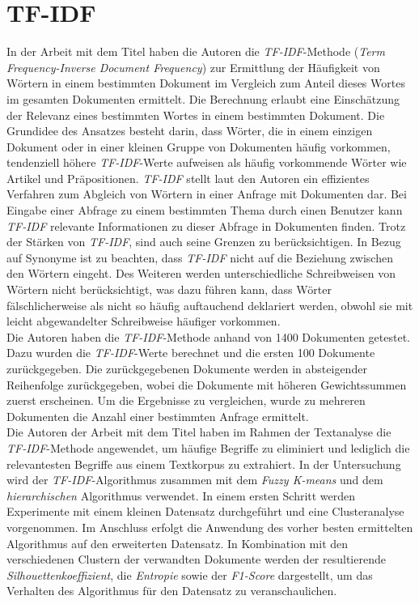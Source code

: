 \section{TF-IDF}
In der Arbeit mit dem Titel \cite{ramos2003using} haben die Autoren \citeauthor{ramos2003using} die \emph{TF-IDF}-Methode (\emph{Term Frequency-Inverse Document Frequency}) zur Ermittlung der Häufigkeit von Wörtern in einem bestimmten Dokument im Vergleich zum Anteil dieses Wortes im gesamten Dokumenten ermittelt. Die Berechnung erlaubt eine Einschätzung der Relevanz eines bestimmten Wortes in einem bestimmten Dokument. Die Grundidee des Ansatzes besteht darin, dass Wörter, die in einem einzigen Dokument oder in einer kleinen Gruppe von Dokumenten häufig vorkommen, tendenziell höhere \emph{TF-IDF}-Werte aufweisen als häufig vorkommende Wörter wie Artikel und Präpositionen. \emph{TF-IDF} stellt laut den Autoren ein effizientes Verfahren zum Abgleich von Wörtern in einer Anfrage mit Dokumenten dar. Bei Eingabe einer Abfrage zu einem bestimmten Thema durch einen Benutzer kann \emph{TF-IDF} relevante Informationen zu dieser Abfrage in Dokumenten finden. Trotz der Stärken von \emph{TF-IDF}, sind auch seine Grenzen zu berücksichtigen. In Bezug auf Synonyme ist zu beachten, dass \emph{TF-IDF} nicht auf die Beziehung zwischen den Wörtern eingeht. Des Weiteren werden unterschiedliche Schreibweisen von Wörtern nicht berücksichtigt, was dazu führen kann, dass Wörter fälschlicherweise als nicht so häufig auftauchend deklariert werden, obwohl sie mit leicht abgewandelter Schreibweise häufiger vorkommen.\\
Die Autoren haben die \emph{TF-IDF}-Methode anhand von 1400 Dokumenten getestet. Dazu wurden die \emph{TF-IDF}-Werte berechnet und die ersten 100 Dokumente zurückgegeben. Die zurückgegebenen Dokumente werden in absteigender Reihenfolge zurückgegeben, wobei die Dokumente mit höheren Gewichtssummen zuerst erscheinen. Um die Ergebnisse zu vergleichen, wurde zu mehreren Dokumenten die Anzahl einer bestimmten Anfrage ermittelt.\\

Die Autoren \citeauthor{bafna2016document} der Arbeit mit dem Titel \cite{bafna2016document} haben im Rahmen der Textanalyse die \emph{TF-IDF}-Methode angewendet, um häufige Begriffe zu eliminiert und lediglich die relevantesten Begriffe aus einem Textkorpus zu extrahiert. In der Untersuchung wird der \emph{TF-IDF}-Algorithmus zusammen mit dem \emph{Fuzzy K-means} und dem \emph{hierarchischen} Algorithmus verwendet. In einem ersten Schritt werden Experimente mit einem kleinen Datensatz durchgeführt und eine Clusteranalyse vorgenommen. Im Anschluss erfolgt die Anwendung des vorher besten ermittelten Algorithmus auf den erweiterten Datensatz. In Kombination mit den verschiedenen Clustern der verwandten Dokumente werden der resultierende \emph{Silhouettenkoeffizient}, die \emph{Entropie} sowie der \emph{F1-Score} dargestellt, um das Verhalten des Algorithmus für den Datensatz zu veranschaulichen.\\
